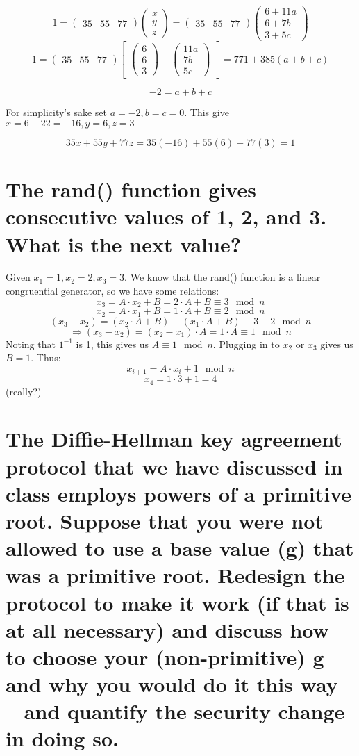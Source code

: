 \documentclass[]{article}
\begin{document}
$$1 = 
\begin{pmatrix}
	35 & 55 & 77
\end{pmatrix}
\begin{pmatrix}
	x\\
	y\\
	z
\end{pmatrix}
= 
\begin{pmatrix}
	35 & 55 & 77
\end{pmatrix}
\begin{pmatrix}
	6 + 11a\\
	6 + 7b\\
	3 + 5c
\end{pmatrix}$$
$$1 = 
\begin{pmatrix}
	35 & 55 & 77
\end{pmatrix}
\begin{bmatrix}
\begin{pmatrix}
	6\\
	6\\
	3
\end{pmatrix}
 + 
\begin{pmatrix}
	11a\\
	7b\\
	5c
\end{pmatrix}
\end{bmatrix}
= 771 + 385(a + b + c)
$$

$$-2 = a + b + c$$

For simplicity's sake set $a = -2, b = c = 0$.  This give $x = 6 - 22 = -16, y = 6, z = 3$

$$35x + 55y + 77z = 35(-16) + 55(6) + 77(3) = 1$$


\section{The rand() function gives consecutive values of 1, 2, and 3.  What is the next value?}
Given $x_1 = 1, x_2 = 2, x_3 = 3$.  We know that the rand() function is a linear congruential generator, so we have some relations:
$$x_3 = A\cdot x_2 + B = 2\cdot A + B \equiv 3 \mod n$$
$$x_2 = A\cdot x_1 + B = 1\cdot A + B \equiv 2 \mod n$$
$$(x_3 - x_2) = (x_2\cdot A + B) - (x_1\cdot A + B) \equiv 3 - 2 \mod n$$
$$\Rightarrow (x_3 - x_2) = (x_2 - x_1) \cdot A =  1\cdot A\equiv 1 \mod n$$
Noting that $1^{-1}$ is 1, this gives us $A \equiv 1 \mod n$.  Plugging in to $x_2$ or $x_3$ gives us $B = 1$.  Thus:
$$x_{i+1} = A \cdot x_i + 1 \mod n$$
$$x_4 = 1 \cdot 3 + 1 = 4$$
(really?)

\section{The Diffie-Hellman key agreement protocol that we have discussed in class employs powers of a primitive root. Suppose that you were not allowed to use a base value (g) that was a primitive root. Redesign the protocol to make it work (if that is at all necessary) and discuss how to choose your (non-primitive) g and why you would do it this way – and quantify the security change in doing so.}
\end{document}
